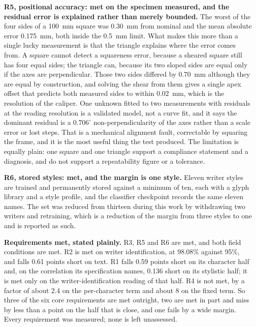         \textbf{R5, positional accuracy: met on the specimen measured, and the residual error is explained rather than merely bounded.}
        The worst of the four sides of a 100~mm square was 0.30~mm from nominal and the mean absolute error 0.175~mm, both inside the 0.5~mm limit.
        What makes this more than a single lucky measurement is that the triangle explains where the error comes from.
        A square cannot detect a squareness error, because a sheared square still has four equal sides; the triangle can, because its two sloped sides are equal only if the axes are perpendicular.
        Those two sides differed by 0.70~mm although they are equal by construction, and solving the shear from them gives a single apex offset that predicts both measured sides to within 0.02~mm, which is the resolution of the caliper.
        One unknown fitted to two measurements with residuals at the reading resolution is a validated model, not a curve fit, and it says the dominant residual is a $0.706^{\circ}$ non-perpendicularity of the axes rather than a scale error or lost steps.
        That is a mechanical alignment fault, correctable by squaring the frame, and it is the most useful thing the test produced.
        The limitation is equally plain: one square and one triangle support a compliance statement and a diagnosis, and do not support a repeatability figure or a tolerance.

        \textbf{R6, stored styles: met, and the margin is one style.}
        Eleven writer styles are trained and permanently stored against a minimum of ten, each with a glyph library and a style profile, and the classifier checkpoint records the same eleven names.
        The set was reduced from thirteen during this work by withdrawing two writers and retraining, which is a reduction of the margin from three styles to one and is reported as such.

        \textbf{Requirements met, stated plainly.}
        R3, R5 and R6 are met, and both field conditions are met.
        R2 is met on writer identification, at 98.08\% against 95\%, and falls 0.61 points short on text.
        R1 falls 0.59 points short on its character half and, on the correlation its specification names, 0.136 short on its stylistic half; it is met only on the writer-identification reading of that half.
        R4 is not met, by a factor of about 2.4 on the per-character term and about 8 on the fixed term.
        So three of the six core requirements are met outright, two are met in part and miss by less than a point on the half that is close, and one fails by a wide margin. Every requirement was measured; none is left unassessed.

